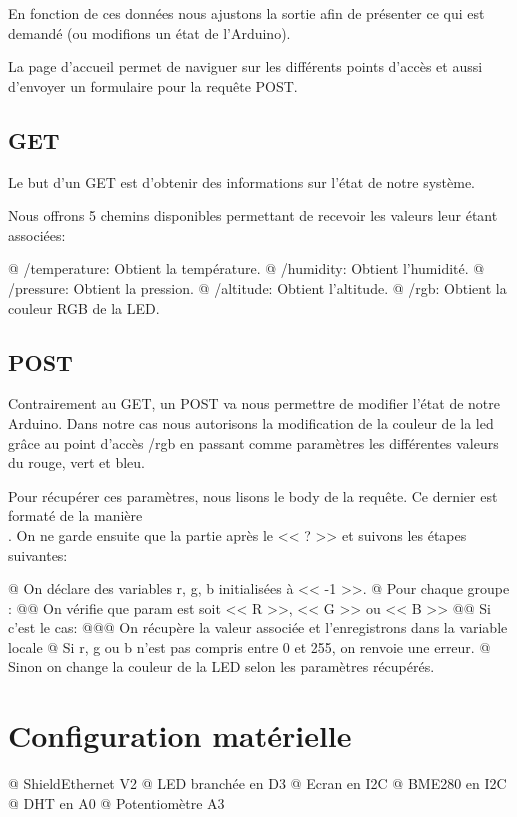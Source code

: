 \documentclass{report}
\begin{document}
		En fonction de ces données nous ajustons la sortie afin de présenter ce qui est demandé (ou modifions un état de l'Arduino).
		
		La page d'accueil permet de naviguer sur les différents points d'accès et aussi d'envoyer un formulaire pour la requête POST.
		
		
		\section{GET}
			Le but d'un GET est d'obtenir des informations sur l'état de notre système.
			
			Nous offrons 5 chemins disponibles permettant de recevoir les valeurs leur étant associées:
			\begin{easylist}
				@ /temperature: Obtient la température.
				@ /humidity: Obtient l'humidité.
				@ /pressure: Obtient la pression.
				@ /altitude: Obtient l'altitude.
				@ /rgb: Obtient la couleur RGB de la LED.
			\end{easylist}
		
		\section{POST}
			Contrairement au GET, un POST va nous permettre de modifier l'état de notre Arduino.
			Dans notre cas nous autorisons la modification de la couleur de la led grâce au point d'accès /rgb en passant comme paramètres les différentes valeurs du rouge, vert et bleu.
			
			Pour récupérer ces paramètres, nous lisons le body de la requête.
			Ce dernier est formaté de la manière \\.
			On ne garde ensuite que la partie après le << ? >> et suivons les étapes suivantes:
			\begin{easylist}[itemize]
				@ On déclare des variables r, g, b initialisées à << -1 >>.
				@ Pour chaque groupe :
				@@ On vérifie que param est soit << R >>, << G >> ou << B >>
				@@ Si c'est le cas:
				@@@ On récupère la valeur associée et l'enregistrons dans la variable locale
				@ Si r, g ou b n'est pas compris entre 0 et 255, on renvoie une erreur.
				@ Sinon on change la couleur de la LED selon les paramètres récupérés.
			\end{easylist}
			
  		
\appendix
	\chapter{Configuration matérielle}
		\begin{easylist}[itemize]
			@ ShieldEthernet V2
			@ LED branchée en D3
			@ Ecran en I2C
			@ BME280 en I2C
			@ DHT en A0
			@ Potentiomètre A3	
		\end{easylist}
\end{document}
